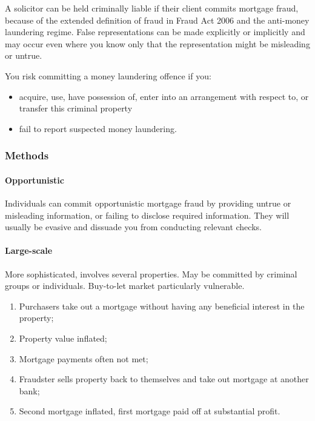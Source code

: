 \documentclass[
]{article}
\providecommand{\tightlist}{%
  \setlength{\itemsep}{0pt}\setlength{\parskip}{0pt}}
\begin{document}
A solicitor can be held criminally liable if their client commits
mortgage fraud, because of the extended definition of fraud in Fraud Act
2006 and the anti-money laundering regime. False representations can be
made explicitly or implicitly and may occur even where you know only
that the representation might be misleading or untrue.

You risk committing a money laundering offence if you:

\begin{itemize}
\tightlist
\item
  acquire, use, have possession of, enter into an arrangement with
  respect to, or transfer this criminal property
\item
  fail to report suspected money laundering.
\end{itemize}

\hypertarget{methods}{%
\subsubsection{Methods}\label{methods}}

\hypertarget{opportunistic}{%
\paragraph{Opportunistic}\label{opportunistic}}

Individuals can commit opportunistic mortgage fraud by providing untrue
or misleading information, or failing to disclose required information.
They will usually be evasive and dissuade you from conducting relevant
checks.

\hypertarget{large-scale}{%
\paragraph{Large-scale}\label{large-scale}}

More sophisticated, involves several properties. May be committed by
criminal groups or individuals. Buy-to-let market particularly
vulnerable.

\begin{enumerate}
\def\labelenumi{\arabic{enumi}.}
\tightlist
\item
  Purchasers take out a mortgage without having any beneficial interest
  in the property;
\item
  Property value inflated;
\item
  Mortgage payments often not met;
\item
  Fraudster sells property back to themselves and take out mortgage at
  another bank;
\item
  Second mortgage inflated, first mortgage paid off at substantial
  profit.
\end{enumerate}
\end{document}
